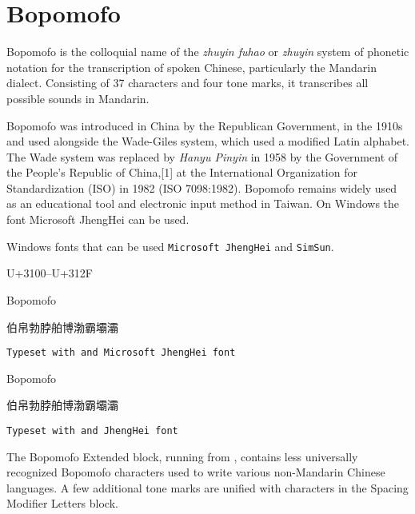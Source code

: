 

\section{Bopomofo}
\label{s:bopomofo}
Bopomofo is the colloquial name of the \textit{zhuyin fuhao} or \textit{zhuyin} system of phonetic notation for the transcription of spoken Chinese, particularly the Mandarin dialect. Consisting of 37 characters and four tone marks, it transcribes all possible sounds in Mandarin. 

Bopomofo was introduced in China by the Republican Government, in the 1910s and used alongside the Wade-Giles system, which used a modified Latin alphabet. The Wade system was replaced by \textit{Hanyu Pinyin} in 1958 by the Government of the People's Republic of China,[1] at the International Organization for Standardization (ISO) in 1982 (ISO 7098:1982). Bopomofo remains widely used as an educational tool and electronic input method in Taiwan. On Windows the font Microsoft JhengHei can be used. 

Windows fonts that can be used \texttt{Microsoft JhengHei} and \texttt{SimSun}.

U+3100–U+312F
\newfontfamily{}

\begin{scriptexample}[]{Bopomofo}
{\centering\bopomofo 

伯帛勃脖舶博渤霸壩灞

}

\hfill \texttt{Typeset with \cmd{\bopomofo} and Microsoft JhengHei font }
\end{scriptexample}

\begin{scriptexample}[]{Bopomofo}

{\centering\bopomofo

伯帛勃脖舶博渤霸壩灞

}
\hfill \texttt{Typeset with \cmd{\bopomofo} and JhengHei font }
\end{scriptexample}

\arial

The Bopomofo Extended block, running from , contains less universally recognized Bopomofo characters used to write various non-Mandarin Chinese languages. A few additional tone marks are unified with characters in the Spacing Modifier Letters block. 









